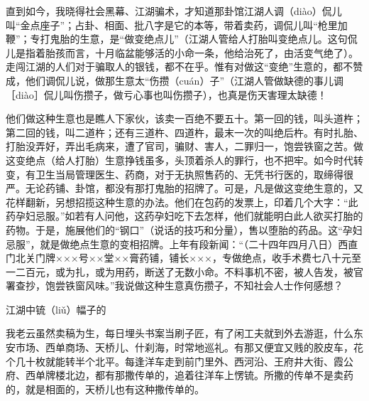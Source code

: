 \documentclass[12pt,UTF8]{ctexbook}
\begin{document}
直到如今，我晓得社会黑幕、江湖骗术，才知道那卦馆江湖人调（diào）侃儿叫“金点座子”；占卦、相面、批八字是它的本等，带着卖药，调侃儿叫“枪里加鞭”；专打鬼胎的生意，是“做变绝点儿”（江湖人管给人打胎叫变绝点儿。这句侃儿是指着胎孩而言，十月临盆能够活的小命一条，他给治死了，由活变气绝了）。走闯江湖的人们对于骗取人的银钱，都不在乎。惟有对做这“变绝”生意的，都不赞成，他们调侃儿说，做那生意太“伤攒（cuán）子”（江湖人管做缺德的事儿调［diào］侃儿叫伤攒子，做亏心事也叫伤攒子），也真是伤天害理太缺德！

他们做这种生意也是瞧人下家伙，该卖一百绝不要五十。第一回的钱，叫头道杵；第二回的钱，叫二道杵；还有三道杵、四道杵，最末一次的叫绝后杵。有时扎胎、打胎没弄好，弄出毛病来，遭了官司，骗财、害人，二罪归一，饱尝铁窗之苦。做这变绝点（给人打胎）生意挣钱虽多，头顶着杀人的罪行，也不把牢。如今时代转变，有卫生当局管理医生、药商，对于无执照售药的、无凭书行医的，取缔得很严。无论药铺、卦馆，都没有那打鬼胎的招牌了。可是，凡是做这变绝生意的，又花样翻新，另想招揽这种生意的办法。他们在包药的发票上，印着几个大字：“此药孕妇忌服。”如若有人问他，这药孕妇吃下去怎样，他们就能明白此人欲买打胎的药物。于是，施展他们的“钢口”（说话的技巧和分量），售以堕胎的药品。这“孕妇忌服”，就是做绝点生意的变相招牌。上年有段新闻：“（二十四年四月八日）西直门北关门牌×××号××堂××膏药铺，铺长×××，专做绝点，收手术费七八十元至一二百元，或为扎，或为用药，断送了无数小命。不料事机不密，被人告发，被官署查抄，饱尝铁窗风味。”我说做这种生意真伤攒子，不知社会人士作何感想？





江湖中锍（liǔ）幅子的


我老云虽然卖稿为生，每日埋头书案当刷子匠，有了闲工夫就到外去游逛，什么东安市场、西单商场、天桥儿、什刹海，时常地巡礼。有那又便宜又贱的胶皮车，花个几十枚就能转半个北平。每逢洋车走到前门里外、西河沿、王府井大街、霞公府、西单牌楼北边，都有那撒传单的，追着往洋车上愣锍。所撒的传单不是卖药的，就是相面的，天桥儿也有这种撒传单的。
\end{document}
